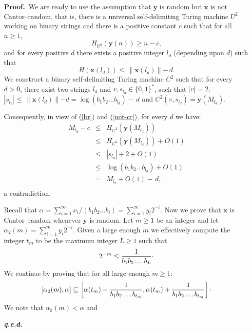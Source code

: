 \documentclass[11pt,a4paper,twoside]{article}
\newcommand{\x}{{\mathbf x}}
\newcommand{\y}{{\mathbf y}}
\def \raisedot {\raisebox{.5ex}{.}}
\newenvironment{proof}{\textbf{Proof.\,}}{\hfill\textbf{\itshape
q.e.d.}\par}
\begin{document}
\begin{proof}
We are ready to use the assumption  that
$\y$ is  random but $\x$ is not Cantor--random, that is, there is
  a universal self-delimiting Turing machine $U^{2}$ working
on binary strings and there is
 a positive constant $c$ such that for all $n\ge 1$,
\begin{equation}
\label{br}
H_{U^{2}} (\y(n)) \ge n-c,
\end{equation}
and
 for every positive $d$ there exists a positive integer $l_{d}$ (depending
upon $d$) such that
\begin{equation}
\label{not-cr}
H(\x(l_{d})) \le \, \parallel \x(l_{d})
\parallel - \, d.
\end{equation}
We construct a binary self-delimiting Turing machine $C^{2}$
such that for every $d>0$, there exist two strings $l_{d}$ and $v,
s_{l_{d}}\in \{0,1\}^{*}$, such that $|v| = 2,$  $|s_{l_{d}}| \le
\,\parallel  \x(l_{d}) \parallel -d = \log (b_{1} b_{2}\ldots b_{l_{d}}) -\, d$
and $C^{2}(v, s_{l_{d}}) = \y(M_{l_{d}})$.

Consequently, in view of (\ref{br}) and (\ref{not-cr}),  for every $d$ we
have:
\begin{eqnarray*}
M_{l_{d}} -c & \le &  H_{U^{2}}(\y(M_{l_{d}}))\\
& \le &  H_{C^{2}}(\y(M_{l_{d}})) + O(1)\\
& \le & |s_{l_{d}}| + 2 + O(1)\\
& \le & \log (b_{1} b_{2}\ldots b_{l_{d}}) + O(1)\\
& = &  M_{l_{d}} + O(1) -  \,d,\\
\end{eqnarray*}
a contradiction.

Recall that $\alpha = \sum_{i=1}^{\infty} x_{i}/(b_{1} b_{2}\ldots b_{i}) =
\sum_{i=1}^{\infty} y_{i}2^{-i}$. Now we prove that $\x$ is Cantor--random
whenever $\y$ is random. Let $m\ge 1$ be an integer and let $\alpha_{2}(m)
= \sum_{i=1}^{m} y_{i}2^{-i}$. Given  a large enough $m$ we effectively
compute the integer $t_{m}$ to be the maximum integer $L\ge 1$ such that
\begin{equation}
\label{tm}
2^{-m} \le \frac{1}{b_{1}b_{2}\ldots b_{L}}\raisedot
\end{equation}
We continue by proving that for all large enough  $m\ge 1$:
\begin{equation}
\label{cantorineq}
[\alpha_{2}(m), \alpha] \subseteq \left[\alpha (t_{m})
-
\frac{1}{b_{1}b_{2}\ldots b_{t_{m}}}, \alpha (t_{m}) +
\frac{1}{b_{1}b_{2}\ldots b_{t_{m}}}\right]\raisedot
\end{equation}
We note that $\alpha_{2}(m) < \alpha$ and




\end{proof}
\end{document}
